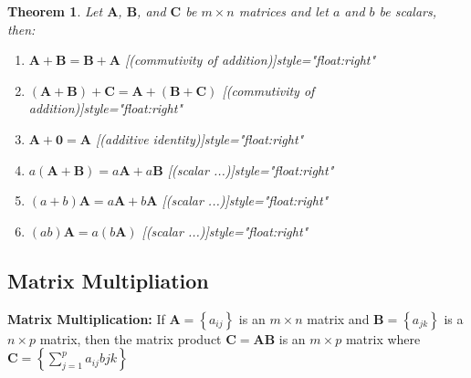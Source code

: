 \documentclass[
]{book}
\newtheorem{theorem}{Theorem}[chapter]
\theoremstyle{definition}
\theoremstyle{definition}
\theoremstyle{definition}
\theoremstyle{definition}
\theoremstyle{remark}
\begin{document}
\begin{theorem}

Let \(\mathbf{A}\), \(\mathbf{B}\), and \(\mathbf{C}\) be \(m \times n\) matrices and let \(a\) and \(b\) be scalars, then:

\begin{enumerate}
\def\labelenumi{\arabic{enumi})}
\item
  \(\mathbf{A} + \mathbf{B} = \mathbf{B} + \mathbf{A}\) \hfill [(commutivity of addition)]{style="float:right"}
\item
  \((\mathbf{A} + \mathbf{B}) + \mathbf{C} = \mathbf{A} + (\mathbf{B} + \mathbf{C})\) \hfill [(commutivity of addition)]{style="float:right"}
\item
  \(\mathbf{A} + \mathbf{0} = \mathbf{A}\) \hfill [(additive identity)]{style="float:right"}
\item
  \(a (\mathbf{A} + \mathbf{B}) = a \mathbf{A} + a \mathbf{B}\) \hfill [(scalar ...)]{style="float:right"}
\item
  \((a + b)\mathbf{A} = a \mathbf{A} + b \mathbf{A}\) \hfill [(scalar ...)]{style="float:right"}
\item
  \((ab)\mathbf{A} = a (b\mathbf{A})\) \hfill [(scalar ...)]{style="float:right"}
\end{enumerate}

\end{theorem}

\hypertarget{matrix-multipliation}{%
\subsection{Matrix Multipliation}\label{matrix-multipliation}}

\textbf{Matrix Multiplication:} If \(\mathbf{A} = \left\{ a_{ij} \right\}\) is an \(m \times n\) matrix and \(\mathbf{B} = \left\{ a_{jk} \right\}\) is a \(n \times p\) matrix, then the matrix product \(\mathbf{C} = \mathbf{A} \mathbf{B}\) is an \(m \times p\) matrix where \(\mathbf{C} = \left\{ \sum_{j=1}^p a_{ij} b{jk} \right\}\)
\end{document}
